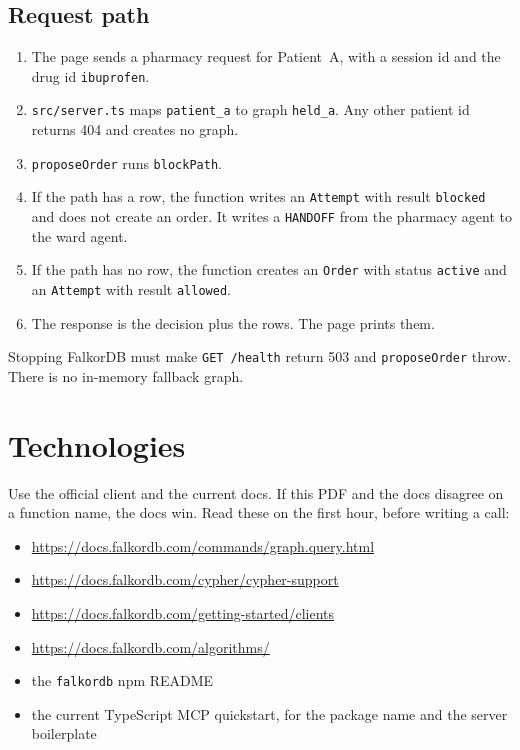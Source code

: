 \documentclass[11pt,a4paper]{article}
\newcommand{\code}[1]{\texttt{#1}}
\newcommand{\file}[1]{\texttt{#1}}
\begin{document}
\subsection{Request path}

\begin{enumerate}
  \item The page sends a pharmacy request for Patient~A, with a session id and the drug id \code{ibuprofen}.
  \item \file{src/server.ts} maps \code{patient\_a} to graph \code{held\_a}. Any other patient id returns 404 and creates no graph.
  \item \code{proposeOrder} runs \code{blockPath}.
  \item If the path has a row, the function writes an \code{Attempt} with result \code{blocked} and does not create an order. It writes a \code{HANDOFF} from the pharmacy agent to the ward agent.
  \item If the path has no row, the function creates an \code{Order} with status \code{active} and an \code{Attempt} with result \code{allowed}.
  \item The response is the decision plus the rows. The page prints them.
\end{enumerate}

Stopping FalkorDB must make \code{GET /health} return 503 and \code{proposeOrder} throw.
There is no in-memory fallback graph.

\section{Technologies}

Use the official client and the current docs. If this PDF and the docs disagree on a function name, the docs win.
Read these on the first hour, before writing a call:

\begin{itemize}
  \item \url{https://docs.falkordb.com/commands/graph.query.html}
  \item \url{https://docs.falkordb.com/cypher/cypher-support}
  \item \url{https://docs.falkordb.com/getting-started/clients}
  \item \url{https://docs.falkordb.com/algorithms/}
  \item the \code{falkordb} npm README
  \item the current TypeScript MCP quickstart, for the package name and the server boilerplate
\end{itemize}
\end{document}
